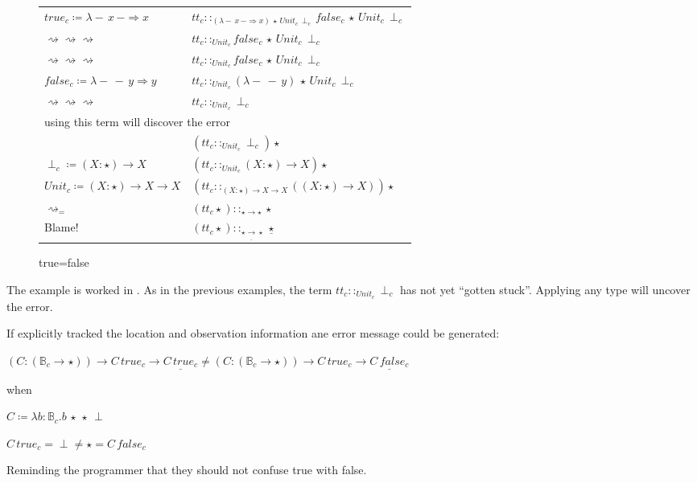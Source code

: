 \begin{sidewaysfigure}
\begin{tabular}{ll}
$true_{c}\coloneqq\lambda-\,x\,-\Rightarrow x$ & $tt_{c}::_{\left(\lambda-\,x\,-\Rightarrow x\right)\,\star\,Unit_{c}\,\perp_{c}}false_{c}\,\star\,Unit_{c}\,\perp_{c}$\tabularnewline

$\rightsquigarrow\rightsquigarrow\rightsquigarrow$ & $tt_{c}::_{Unit_{c}}false_{c}\,\star\,Unit_{c}\,\perp_{c}$\tabularnewline

$\rightsquigarrow\rightsquigarrow\rightsquigarrow$ & $tt_{c}::_{Unit_{c}}false_{c}\,\star\,Unit_{c}\,\perp_{c}$\tabularnewline

$false_{c}\coloneqq\lambda-\,-\,y\Rightarrow y$ & $tt_{c}::_{Unit_{c}}\left(\lambda-\,-\,y\right)\,\star\,Unit_{c}\,\perp_{c}$\tabularnewline

$\rightsquigarrow\rightsquigarrow\rightsquigarrow$ & $tt_{c}::_{Unit_{c}}\perp_{c}$\tabularnewline

\multicolumn{2}{l}{using this term will discover the error}\tabularnewline

& $\left(tt_{c}::_{Unit_{c}}\perp_{c}\right)\star$\tabularnewline
$\perp_{c}\coloneqq\left(X:\star\right)\rightarrow X$ & $\left( tt_{c}::_{Unit_{c}}\left(X:\star\right)\rightarrow X\right)  \star$\tabularnewline

$Unit_{c}\coloneqq\left(X:\star\right)\rightarrow X\rightarrow X$ & $\left( tt_{c}::_{\left(X:\star\right)\rightarrow X\rightarrow X}\left(\left(X:\star\right)\rightarrow X\right)\right)  \star$\tabularnewline

$\rightsquigarrow_{=}$ & $\left(tt_{c}\star\right)::_{\star\rightarrow\star}\star$\tabularnewline
Blame! & $\left(tt_{c}\star\right)::_{\star\underline{\rightarrow}\star}\underline{\star}$\tabularnewline

\end{tabular}
\caption{true=false}
\label{fig:cast-ex-tf}
\end{sidewaysfigure}
 
The example is worked in .
As in the previous examples, the term $tt_{c}::_{Unit_{c}}\perp_{c}$ has not yet ``gotten stuck''.
Applying any type will uncover the error.

If  explicitly tracked the location and observation information ane error message could be generated:
 
$\left(C:\left(\mathbb{B}_{c}\rightarrow\star\right)\right)\rightarrow C\,true_{c}\rightarrow\underline{C\,true_{c}}\neq\left(C:\left(\mathbb{B}_{c}\rightarrow\star\right)\right) \rightarrow C\,true_{c}\rightarrow\underline{C\,false_{c}}$
 
when
 
$C\coloneqq\lambda b:\mathbb{B}_{c}.b\,\star\,\star\,\perp$
 
$C\,true_{c}=\perp\neq\star=C\,false_{c}$

Reminding the programmer that they should not confuse true with false.